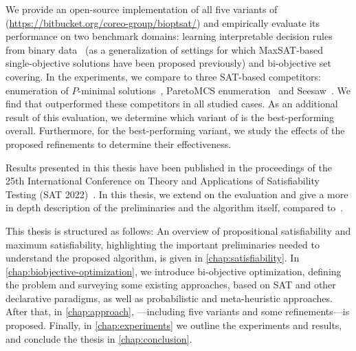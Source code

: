 We provide an open-source implementation of all five variants of \algname{} ({\small\url{https://bitbucket.org/coreo-group/bioptsat/}}) and empirically evaluate its performance on two benchmark domains:
learning interpretable decision rules from binary data~\autocite{DBLP:conf/cp/MaliotovM18} (as a generalization of settings for which MaxSAT-based single-objective solutions have been proposed previously) and bi-objective set covering.
In the experiments, we compare \algname{} to three SAT-based competitors:
enumeration of $P$-minimal solutions~\autocite{DBLP:conf/cp/SohBTB17}, ParetoMCS enumeration~\autocite{DBLP:conf/ijcai/Terra-NevesLM18a} and Seesaw~\autocite{DBLP:conf/cp/JanotaMSM21}.
We find that \algname{} outperformed these competitors in all studied cases.
As an additional result of this evaluation, we determine which variant of \algname{} is the best-performing overall.
Furthermore, for the best-performing variant, we study the effects of the proposed refinements to determine their effectiveness.

Results presented in this thesis have been published in the proceedings of the 25th International Conference on Theory and Applications of Satisfiability Testing (SAT 2022)~\autocite{JabsEtAl2022MaxSATBasedBi}.
In this thesis, we extend on the evaluation and give a more in depth description of the preliminaries and the algorithm itself, compared to~\autocite{JabsEtAl2022MaxSATBasedBi}.

This thesis is structured as follows:
An overview of propositional satisfiability and maximum satisfiability, highlighting the important preliminaries needed to understand the proposed algorithm, is given in \cref{chap:satisfiability}.
In \cref{chap:biobjective-optimization}, we introduce bi-objective optimization, defining the problem and surveying some existing approaches, based on SAT and other declarative paradigms, as well as probabilistic and meta-heuristic approaches.
After that, in \cref{chap:approach}, \algname{}---including five variants and some refinements---is proposed.
Finally, in \cref{chap:experiments} we outline the experiments and results, and conclude the thesis in \cref{chap:conclusion}.